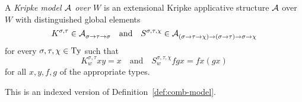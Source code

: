 \begin{defn}
A \emph{Kripke model $\mathcal{A}$ over $W$} is an extensional Kripke applicative structure $\mathcal{A}$ over $W$ with distinguished global elements
\[ K^{\sigma,\tau} \in \mathcal{A}_{\sigma \to \tau \to \sigma}^{} \quad\text{and}\quad
    S^{\sigma,\tau,\chi} \in \mathcal{A}_{(\sigma \to \tau \to \chi) \to (\sigma \to \tau) \to \sigma \to \chi}^{} \]
for every $\sigma, \tau, \chi \in \mathrm{Ty}$ such that
\[ K^{\sigma,\tau}_w x y = x \quad\text{and}\quad
    S^{\sigma,\tau,\chi}_w f g x = fx(gx) \]
for all $x, y, f, g$ of the appropriate types.
\end{defn}
\begin{rem}
This is an indexed version of Definition~\ref{def:comb-model}.
\end{rem}

